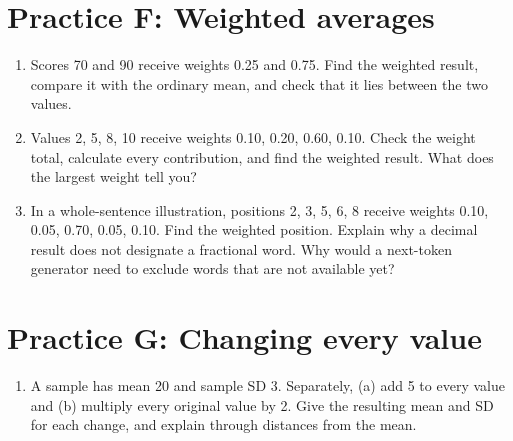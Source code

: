 \section*{Practice F: Weighted averages}
\begin{enumerate}[label=F\arabic*.,leftmargin=2.5em,itemsep=10pt]
\item Scores 70 and 90 receive weights 0.25 and 0.75. Find the weighted result, compare it with the ordinary mean, and check that it lies between the two values.
\item Values 2, 5, 8, 10 receive weights 0.10, 0.20, 0.60, 0.10. Check the weight total, calculate every contribution, and find the weighted result. What does the largest weight tell you?
\item In a whole-sentence illustration, positions 2, 3, 5, 6, 8 receive weights 0.10, 0.05, 0.70, 0.05, 0.10. Find the weighted position. Explain why a decimal result does not designate a fractional word. Why would a next-token generator need to exclude words that are not available yet?
\end{enumerate}
\section*{Practice G: Changing every value}
\begin{enumerate}[label=G\arabic*.,leftmargin=2.5em,itemsep=10pt]
\item A sample has mean 20 and sample SD 3. Separately, (a) add 5 to every value and (b) multiply every original value by 2. Give the resulting mean and SD for each change, and explain through distances from the mean.
\end{enumerate}

\clearpage
